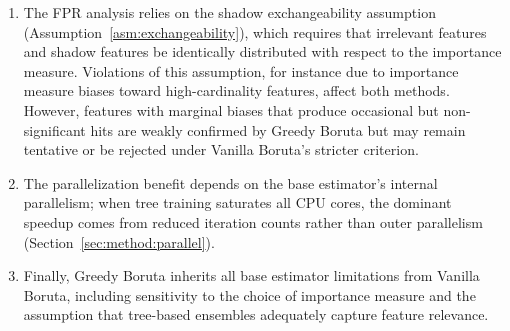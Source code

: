 \documentclass[runningheads]{llncs}
\begin{document}
\begin{enumerate}
    \item The FPR analysis relies on the shadow exchangeability assumption (Assumption~\ref{asm:exchangeability}), which requires that irrelevant features and shadow features be identically distributed with respect to the importance measure. Violations of this assumption, for instance due to importance measure biases toward high-cardinality features, affect both methods. However, features with marginal biases that produce occasional but non-significant hits are weakly confirmed by Greedy Boruta but may remain tentative or be rejected under Vanilla Boruta's stricter criterion.

    \item The parallelization benefit depends on the base estimator's internal parallelism; when tree training saturates all CPU cores, the dominant speedup comes from reduced iteration counts rather than outer parallelism (Section~\ref{sec:method:parallel}).

    \item Finally, Greedy Boruta inherits all base estimator limitations from Vanilla Boruta, including sensitivity to the choice of importance measure and the assumption that tree-based ensembles adequately capture feature relevance.
\end{enumerate}


\end{document}
